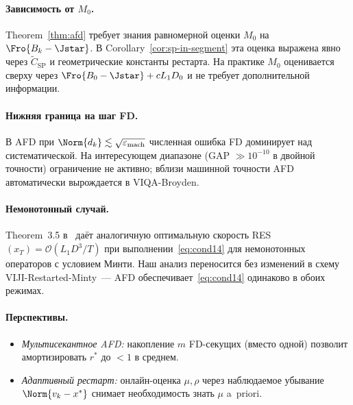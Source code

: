 \paragraph{Зависимость от $M_0$.}
Theorem~\ref{thm:afd} требует знания равномерной оценки $M_0$ на
$\Fro{B_k - \Jstar}$. В Corollary~\ref{cor:sp-in-segment}
эта оценка выражена явно через $\widetilde C_{\mathrm{SP}}$ и геометрические константы
рестарта. На практике $M_0$ оценивается сверху через $\Fro{B_0 - \Jstar} + c L_1 D_0$
и не требует дополнительной информации.

\paragraph{Нижняя граница на шаг FD.}
В AFD при $\Norm{d_k} \lesssim \sqrt{\varepsilon_{\mathrm{mach}}}$ численная
ошибка FD доминирует над систематической. На интересующем диапазоне
(GAP $\gg 10^{-10}$ в двойной точности) ограничение не активно; вблизи
машинной точности AFD автоматически вырождается в VIQA-Broyden.

\paragraph{Немонотонный случай.}
Theorem~3.5 в~\cite{Agafonov2024VIJI} даёт аналогичную оптимальную скорость
RES$(x_T) = \mathcal O(L_1 D^3 / T)$ при выполнении~\eqref{eq:cond14} для
немонотонных операторов с условием Минти. Наш анализ переносится без
изменений в схему VIJI-Restarted-Minty~--- AFD обеспечивает~\eqref{eq:cond14}
одинаково в обоих режимах.

\paragraph{Перспективы.}
\begin{itemize}
\item \emph{Мультисекантное AFD:} накопление $m$ FD-секущих
      (вместо одной) позволит амортизировать $r^{*}$ до $< 1$ в среднем.
\item \emph{Адаптивный рестарт:} онлайн-оценка $\mu, \rho$ через наблюдаемое
      убывание $\Norm{v_k - x^{*}}$ снимает необходимость знать $\mu$ a~priori.
\end{itemize}

